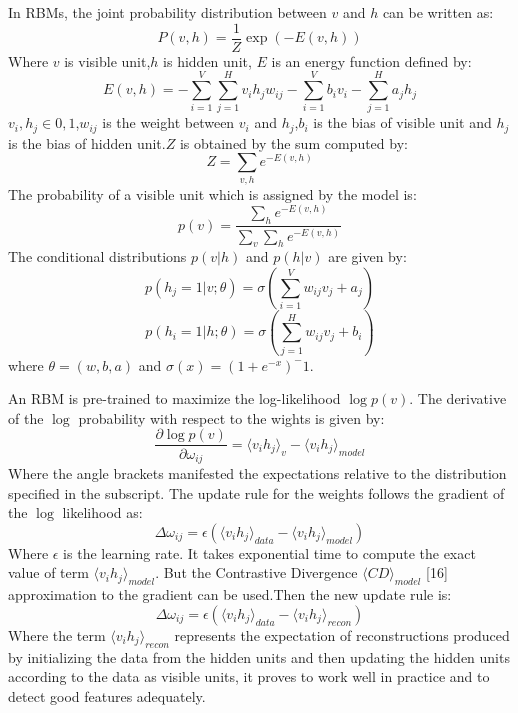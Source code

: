 \documentclass{llncs}
\begin{document}
In RBMs, the joint probability distribution between $v$ and $h$ can be written as:
\begin{equation}
  P(v,h)=\frac{1}{Z}\exp(-E(v,h))
\end{equation}
Where $v$ is visible unit,$h$ is hidden unit, $E$ is an energy function defined by:
\begin{equation}
  E(v,h)=-\sum_{i=1}^{V}\sum_{j=1}^{H}v_ih_jw_{ij}-
  \sum_{i=1}^{V}b_iv_i-\sum_{j=1}^{H}a_jh_j
\end{equation}
$v_i,h_j \in {0,1}$,$w_{ij}$ is the weight between $v_i$ and $h_j$,$b_i$ is the bias of visible unit and $h_j$ is the bias of hidden unit.$Z$ is obtained by the sum computed by:
\begin{equation}
 Z=\sum_{v,h}e^{-E(v,h)}
\end{equation}
The probability of a visible unit which is assigned by the model is:
\begin{equation}
 p(v)=\frac{\sum_he^{-E(v,h)}}{\sum_v\sum_he^{-E(v,h)}}
\end{equation}
The conditional distributions $p(v|h)$ and $p(h|v)$ are given by:
\begin{equation}
 p(h_j=1|v;\theta)=\sigma(\sum_{i=1}^{V}w_{ij}v_j+a_j) 
\end{equation}
\begin{equation}
 p(h_i=1|h;\theta)=\sigma(\sum_{j=1}^{H}w_{ij}v_j+b_i)
\end{equation}
where $\theta=(w,b,a)$ and $\sigma(x)=(1+e^{-x})^-1$.


An RBM is pre-trained to maximize the log-likelihood $\log p(v)$. The derivative of the $\log$ probability with respect to the wights is given by:
\begin{equation}
\frac{\partial \log p(v)}{\partial \omega_{ij}}=\langle v_ih_j \rangle_v - 
\langle v_ih_j \rangle_{model}
\end{equation}
Where the angle brackets manifested the expectations relative to the distribution specified in the subscript. The update rule for the weights follows the gradient of the $\log$ likelihood as:
\begin{equation}
\Delta\omega_{ij}=\epsilon(\langle v_ih_j \rangle_{data} - 
\langle v_ih_j \rangle_{model})
\end{equation}
Where $\epsilon$ is the learning rate. It takes exponential time to compute the exact value of term $\langle v_ih_j \rangle_{model}$. But the Contrastive Divergence $\langle CD \rangle_{model}$ [16] approximation to the gradient can be used.Then the new update rule is:
\begin{equation}
\Delta\omega_{ij}=\epsilon(\langle v_ih_j \rangle_{data} - 
\langle v_ih_j \rangle_{recon})
\end{equation}
Where the term $\langle v_ih_j \rangle_{recon}$ represents the expectation of reconstructions produced by
initializing the data from the hidden units and then updating the hidden units according to the
data as visible units, it proves to work well in practice and to detect good features adequately.
\end{document}
